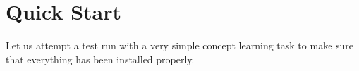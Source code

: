 \section{Quick Start}

Let us attempt a test run with a very simple concept learning task to make sure that everything has been installed properly.

\subsection{\learnrev}
\subsection{\oled}
\subsection{\woled}